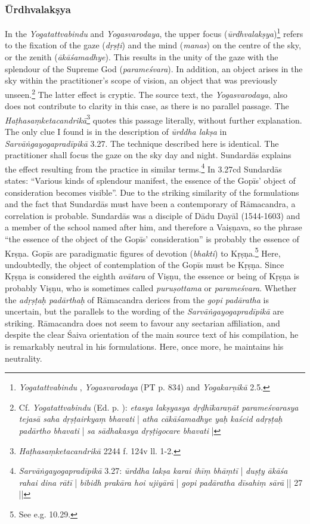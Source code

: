 \subsubsection{Ūrdhvalakṣya}
In the \textit{Yogatattvabindu} and \textit{Yogasvarodaya}, the upper focus (\textit{ūrdhvalakṣya})\footnote{\emph{Yogatattvabindu} , \emph{Yogasvarodaya} (PT p. 834) and \emph{Yogakarṇikā} 2.5.} refers to the fixation of the gaze (\textit{dṛṣṭi}) and the mind (\textit{manas}) on the centre of the sky, or the zenith (\textit{ākāśamadhye}). This results in the unity of the gaze with the splendour of the Supreme God (\textit{parameśvara}). In addition, an object arises in the sky within the practitioner’s scope of vision, an object that was previously unseen.\footnote{Cf. \textit{Yogatattvabindu}  (Ed. p. \pageref{urdhvalaksya}): \textit{etasya lakṣyasya dṛḍhīkaraṇāt parameśvarasya tejasā saha dṛṣṭairkyaṃ bhavati} | \textit{atha cākāśamadhye yaḥ kaścid adṛṣṭaḥ padārtho bhavati} | \textit{sa sādhakasya dṛṣṭigocare bhavati} |} The latter effect is cryptic. The source text, the \textit{Yogasvarodaya}, also does not contribute to clarity in this case, as there is no parallel passage. The \textit{Haṭhasaṃketacandrikā}\footnote{\textit{Haṭhasaṃketacandrikā} 2244 f. 124v ll. 1-2.} quotes this passage literally, without further explanation. The only clue I found is in the description of \textit{ūrddha lakṣa} in \textit{Sarvāṅgayogapradīpikā} 3.27. The technique described here is identical. The practitioner shall focus the gaze on the sky day and night. Sundardās explains the effect resulting from the practice in similar terms.\footnote{\textit{Sarvāṅgayogapradīpikā} 3.27: \textit{ūrddha lakṣa karai ihīṃ bhāṃtī} | \textit{duṣṭy ākāśa rahai dina rātī} | \textit{bibidh prakāra hoi ujiyārā} | \textit{gopi padāratha dīsahiṃ sārā} || 27 ||} In 3.27cd Sundardās states: ``Various kinds of splendour manifest, the essence of the Gopīs' object of consideration becomes visible''. Due to the striking similarity of the formulations and the fact that Sundardās must have been a contemporary of Rāmacandra, a correlation is probable. Sundardās was a disciple of Dādu Dayāl (1544-1603) and a member of the school named after him, and therefore a Vaiṣṇava, so the phrase ``the essence of the object of the Gopīs’ consideration'' is probably the essence of Krṣṇa. Gopīs are paradigmatic figures of devotion (\textit{bhakti}) to Kṛṣṇa.\footnote{See e.g.  10.29.} Here, undoubtedly, the object of contemplation of the Gopīs must be Kṛṣṇa. Since Kṛṣṇa is considered the eighth \textit{avātara} of Viṣṇu, the essence or being of Kṛṣṇa is probably Viṣṇu, who is sometimes called \textit{puruṣottama} or \textit{parameśvara}. Whether the \textit{adṛṣṭaḥ padārthaḥ} of Rāmacandra derices from the \textit{gopi padāratha} is uncertain, but the parallels to the wording of the \textit{Sarvāṅgayogapradīpikā} are striking. Rāmacandra does not seem to favour any sectarian affiliation, and despite the clear Śaiva orientation of the main source text of his compilation, he is remarkably neutral in his formulations. Here, once more, he maintains his neutrality.

